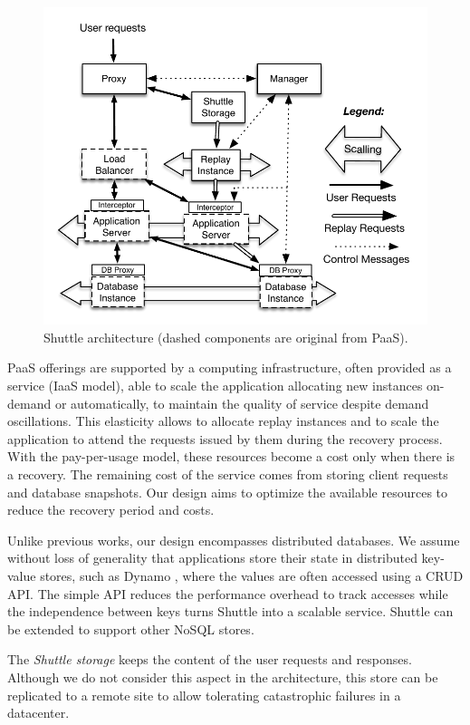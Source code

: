 \begin{figure}
  \centering
  \includegraphics[width=0.8\columnwidth]{images/architectureTiers}
  \caption{Shuttle architecture (dashed components are original from \ac{PaaS}). %
  }
  \label{fig:shuttle_architecture}
\end{figure}

PaaS offerings are supported by a computing infrastructure, often provided as a service (IaaS model), able to scale the application allocating new instances on-demand or automatically, to maintain the quality of service despite demand oscillations. This elasticity  allows to allocate replay instances and to scale the application to attend the requests issued by them during the recovery process.
With the pay-per-usage model, these resources become a cost only when there is a recovery. The remaining cost of the service comes from storing client requests and database snapshots. Our design aims to optimize the available resources to reduce the recovery period and costs. 


Unlike previous works, our design encompasses distributed databases. We assume without loss of generality that applications store their state in distributed key-value stores, such as Dynamo \cite{Decandia2007}, where the values are often accessed using a \acf{CRUD} API. The simple API reduces the performance overhead to track accesses while the independence between keys turns Shuttle into a scalable service. Shuttle can be extended to support other NoSQL stores.

The \emph{Shuttle storage} keeps the content of the user requests and responses. Although we do not consider this aspect in the architecture, this store can be replicated to a remote site to allow tolerating catastrophic failures in a datacenter.

